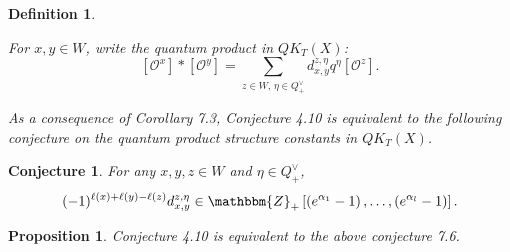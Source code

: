 \documentclass{article}
\newtheorem{definition}[theorem]{Definition}
\newtheorem{conjecture}[theorem]{Conjecture}
\newtheorem{proposition}[theorem]{Proposition}
\def\ref#1{#1}
\begin{document}
\begin{definition}\label{7.5} \rm{
For $x,y\in W$, write the quantum product in $QK_T(X)$: 
$$
 \left[ \mathcal{O}^x\right] *\left[ \mathcal{O}^y\right] = \sum_{z\in W, \, \eta \in Q_+^\vee} d_{x,y}^{z,\eta} q^\eta \left[\mathcal{O}^{z}\right].
$$

As a consequence of Corollary \ref{7.3}, Conjecture \ref{4.10} is equivalent to the following conjecture on the quantum product structure constants in $QK_T(X)$. }
\end{definition}

\begin{conjecture}\label{7.6}
For any $x,y, z \in W$ and $\eta \in Q_+^\vee$, 
$$
(-1)^{\ell(x)+\ell(y)-\ell(z)} d^{z,\eta}_{x,y} \in \mathbbm{Z}_+\left[ \left(e^{\alpha_1}-1\right),\ldots , \left(e^{\alpha_l}-1\right)\right].
$$
\end{conjecture}

\begin{proposition}\label{7.7}
Conjecture \ref{4.10} is equivalent to the above conjecture \ref{7.6}. 
\end{proposition}
\end{document}

